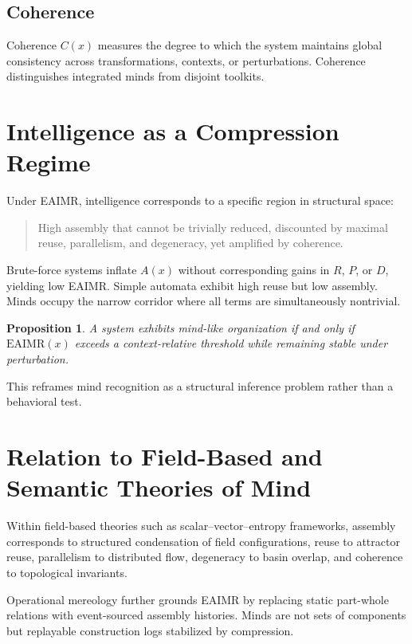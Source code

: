 \documentclass[11pt,letterpaper]{article}
\newtheorem{proposition}{Proposition}
\begin{document}
\subsection{Coherence}

Coherence $C(x)$ measures the degree to which the system maintains global consistency across transformations, contexts, or perturbations. Coherence distinguishes integrated minds from disjoint toolkits.

\section{Intelligence as a Compression Regime}

Under EAIMR, intelligence corresponds to a specific region in structural space:
\begin{quote}
High assembly that cannot be trivially reduced, discounted by maximal reuse, parallelism, and degeneracy, yet amplified by coherence.
\end{quote}

Brute-force systems inflate $A(x)$ without corresponding gains in $R$, $P$, or $D$, yielding low EAIMR. Simple automata exhibit high reuse but low assembly. Minds occupy the narrow corridor where all terms are simultaneously nontrivial.

\begin{proposition}
A system exhibits mind-like organization if and only if $\mathrm{EAIMR}(x)$ exceeds a context-relative threshold while remaining stable under perturbation.
\end{proposition}

This reframes mind recognition as a structural inference problem rather than a behavioral test.

\section{Relation to Field-Based and Semantic Theories of Mind}

Within field-based theories such as scalar--vector--entropy frameworks, assembly corresponds to structured condensation of field configurations, reuse to attractor reuse, parallelism to distributed flow, degeneracy to basin overlap, and coherence to topological invariants.

Operational mereology further grounds EAIMR by replacing static part-whole relations with event-sourced assembly histories. Minds are not sets of components but replayable construction logs stabilized by compression.
\end{document}
